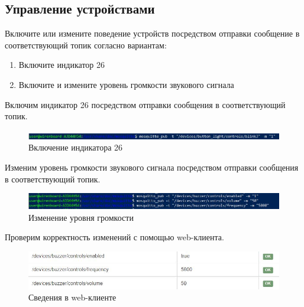 \documentclass[a4paper,14pt]{extarticle}
\begin{document}
	\subsection{Управление устройствами}
	\begin{problem}
		Включите или измените поведение устройств посредством отправки сообщение в
		соответствующий топик согласно вариантам: 
		\begin{enumerate}
			\item Включите индикатор 26
			\item Включите и измените уровень громкости звукового сигнала
		\end{enumerate}
	
	\nonum 
	
		Включим индикатор 26 посредством отправки сообщения в
	соответствующий топик.
	\begin{figure}[htpb]
		\centering
		\includegraphics[width=1\linewidth]{images/ssh-powershell3.1}
		\caption{Включение индикатора 26}
		\label{fig:ssh-powershell3.1}
	\end{figure}

	Изменим уровень громкости звукового сигнала посредством отправки сообщения в
	соответствующий топик.
	
	\begin{figure}[htbp]
		\centering
		\includegraphics[width=0.9\linewidth]{images/ssh-powershell3.2}
		\caption{Изменение уровня громкости}
		\label{fig:ssh-powershell3.2}
	\end{figure}
	Проверим корректность изменений с помощью web-клиента.
	\begin{figure}[htbp]
		\centering
		\includegraphics[width=0.8\linewidth]{images/ssh-powershell3.3}
		\caption{Сведения в web-клиенте}
		\label{fig:ssh-powershell3}
	\end{figure}	
	
	\end{problem}
	
\end{document}

